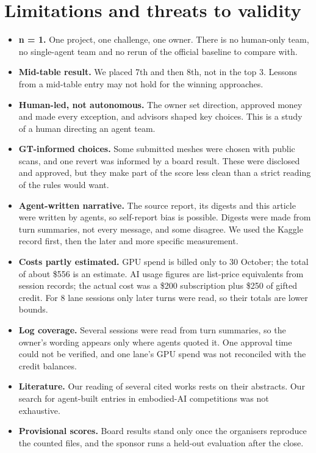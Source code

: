 \documentclass[11pt]{article}
\begin{document}
\section{Limitations and threats to validity}
\begin{itemize}[itemsep=2pt,topsep=3pt]
\item \textbf{n = 1.} One project, one challenge, one owner. There is no human-only team, no single-agent team and no rerun of the official baseline to compare with.
\item \textbf{Mid-table result.} We placed 7th and then 8th, not in the top 3. Lessons from a mid-table entry may not hold for the winning approaches.
\item \textbf{Human-led, not autonomous.} The owner set direction, approved money and made every exception, and advisors shaped key choices. This is a study of a human directing an agent team.
\item \textbf{GT-informed choices.} Some submitted meshes were chosen with public scans, and one revert was informed by a board result. These were disclosed and approved, but they make part of the score less clean than a strict reading of the rules would want.
\item \textbf{Agent-written narrative.} The source report, its digests and this article were written by agents, so self-report bias is possible. Digests were made from turn summaries, not every message, and some disagree. We used the Kaggle record first, then the later and more specific measurement.
\item \textbf{Costs partly estimated.} GPU spend is billed only to 30 October; the total of about \$556 is an estimate. AI usage figures are list-price equivalents from session records; the actual cost was a \$200 subscription plus \$250 of gifted credit. For 8 lane sessions only later turns were read, so their totals are lower bounds.
\item \textbf{Log coverage.} Several sessions were read from turn summaries, so the owner's wording appears only where agents quoted it. One approval time could not be verified, and one lane's GPU spend was not reconciled with the credit balances.
\item \textbf{Literature.} Our reading of several cited works rests on their abstracts. Our search for agent-built entries in embodied-AI competitions was not exhaustive.
\item \textbf{Provisional scores.} Board results stand only once the organisers reproduce the counted files, and the sponsor runs a held-out evaluation after the close.
\end{itemize}
\end{document}
